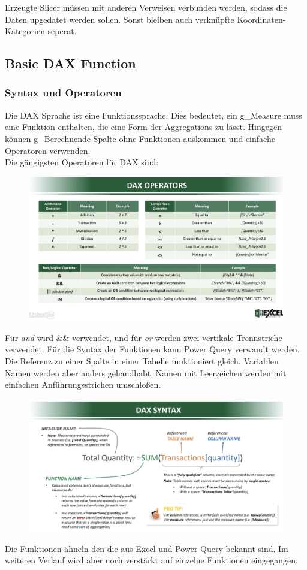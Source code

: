 Erzeugte Slicer müssen mit anderen Verweisen verbunden werden, sodass die Daten upgedatet werden sollen. Sonst bleiben auch verknüpfte Koordinaten-Kategorien seperat.
\subsection{Basic DAX Function}
\subsubsection{Syntax und Operatoren}
Die \gls{DAX} Sprache ist eine Funktionssprache. Dies bedeutet, ein \gls{g_Measure} muss eine Funktion enthalten, die eine Form der Aggregations zu lässt. Hingegen können \gls{g_Berechnende-Spalte} ohne Funktionen auskommen und einfache Operatoren verwenden. \\
Die gängigsten Operatoren für \gls{DAX} sind:

\begin{figure}[H]
	\centering
	\includegraphics[scale = 0.3]{attachment/chapter_1/screenshot087}
	\caption{}
	\label{fig:screenshot087}
\end{figure}
Für \textit{and} wird $\&\&$ verwendet, und für \textit{or} werden zwei vertikale Trennstriche verwendet. 
Für die Syntax der Funktionen kann Power Query verwandt werden. Die Referenz zu einer Spalte in einer Tabelle funktioniert gleich. Variablen Namen werden aber anders gehandhabt. Namen mit Leerzeichen werden mit einfachen Anführungsstrichen umschloßen.
\begin{figure}[H]
	\centering
	\includegraphics[scale = 0.3]{attachment/chapter_1/screenshot088}
	\caption{}
	\label{fig:screenshot088}
\end{figure}
Die Funktionen ähneln den die aus Excel und Power Query bekannt sind. Im weiteren Verlauf wird aber noch verstärkt auf einzelne Funktionen eingegangen.

